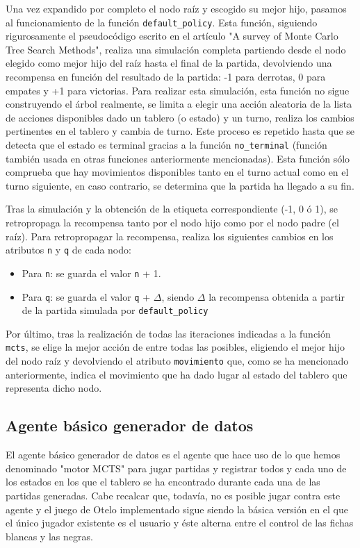 \documentclass[conference]{IEEEtran}
\begin{document}
Una vez expandido por completo el nodo raíz y escogido su mejor hijo, pasamos al funcionamiento de la función \texttt{default\_policy}. Esta función, siguiendo rigurosamente el pseudocódigo escrito en el artículo "A survey of Monte Carlo Tree Search Methods", realiza una simulación completa partiendo desde el nodo elegido como mejor hijo del raíz hasta el final de la partida, devolviendo una recompensa en función del resultado de la partida: -1 para derrotas, 0 para empates y +1 para victorias. Para realizar esta simulación, esta función no sigue construyendo el árbol realmente, se limita a elegir una acción aleatoria de la lista de acciones disponibles dado un tablero (o estado) y un turno, realiza los cambios pertinentes en el tablero y cambia de turno. Este proceso es repetido hasta que se detecta que el estado es terminal gracias a la función \texttt{no\_terminal} (función también usada en otras funciones anteriormente mencionadas). Esta función sólo comprueba que hay movimientos disponibles tanto en el turno actual como en el turno siguiente, en caso contrario, se determina que la partida ha llegado a su fin.

Tras la simulación y la obtención de la etiqueta correspondiente (-1, 0 ó 1), se retropropaga la recompensa tanto por el nodo hijo como por el nodo padre (el raíz). Para retropropagar la recompensa, realiza los siguientes cambios en los atributos \texttt{n} y \texttt{q} de cada nodo:

\begin{itemize}
    \item Para \texttt{n}: se guarda el valor \texttt{n} + 1.
    \item Para \texttt{q}: se guarda el valor \texttt{q} + $\Delta$, siendo $\Delta$ la recompensa obtenida a partir de la partida simulada por \texttt{default\_policy}
\end{itemize}

Por último, tras la realización de todas las iteraciones indicadas a la función \texttt{mcts}, se elige la mejor acción de entre todas las posibles, eligiendo el mejor hijo del nodo raíz y devolviendo el atributo \texttt{movimiento} que, como se ha mencionado anteriormente, indica el movimiento que ha dado lugar al estado del tablero que representa dicho nodo.

\subsection{Agente básico generador de datos}
El agente básico generador de datos es el agente que hace uso de lo que hemos denominado "motor MCTS" para jugar partidas y registrar todos y cada uno de los estados en los que el tablero se ha encontrado durante cada una de las partidas generadas. Cabe recalcar que, todavía, no es posible jugar contra este agente y el juego de Otelo implementado sigue siendo la básica versión en el que el único jugador existente es el usuario y éste alterna entre el control de las fichas blancas y las negras.
\end{document}
